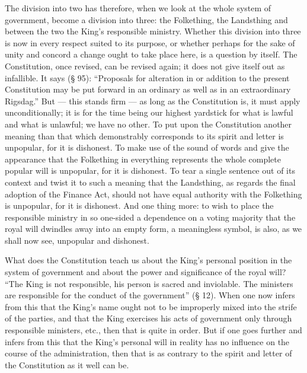 \documentclass[12pt,a4paper,openany]{book}
\newcommand{\opage}[1]{\marginnote{\footnotesize\textit{[#1]}}}
\begin{document}
The division into two has therefore, when we look at the whole
system of government, become a division into three: the Folkething,
the Landsthing and between the two the King's responsible
ministry. Whether this division into three is now in every respect
suited to its purpose, or whether perhaps for the sake of unity
and concord a change ought to take place here,
is a question by itself. The Constitution, once
revised, can be revised again; it does not
give itself out as infallible. It says (§ 95): ``Proposals
for alteration in or addition to the present Constitution
may be put forward in an ordinary as well as in an extraordinary
Rigsdag.'' But --- this stands firm --- as
long as the Constitution is, it must apply unconditionally; it
is for the time being our highest yardstick for what is
lawful and what is unlawful; we have no other.
To put upon the Constitution another meaning than that
which demonstrably corresponds to its spirit and letter is unpopular,
for it is dishonest. To make use of the sound of words
and give the appearance that the Folkething in everything
represents the whole complete popular will is
unpopular, for it is dishonest. To tear a single sentence
out of its context and twist it to such
a meaning that the Landsthing, as regards the
final adoption of the Finance Act, should not have equal
authority with the Folkething is unpopular, for it is
dishonest. And one thing more: to wish to place the responsible
ministry in so one-sided a dependence on a
voting majority that the royal will
\setcounter{footnote}{0}%
\opage{10}dwindles away into an empty form, a meaningless symbol, is
also, as we shall now see, unpopular and dishonest.

What does the Constitution teach us about the King's personal
position in the system of government and about the power and significance of
the royal will? ``The King is not responsible, his person
is sacred and inviolable. The ministers are responsible
for the conduct of the government'' (§ 12). When one now
infers from this that the King's name ought not to be improperly
mixed into the strife of the parties, and that the King
exercises his acts of government only through responsible ministers,
etc., then that is quite in
order. But if one goes further and infers from this that
the King's personal will in reality has no influence
on the course of the administration, then that is as
contrary to the spirit and letter of the Constitution as
it well can be.
\end{document}
